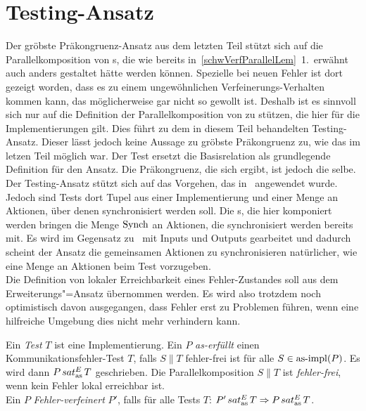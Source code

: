 \section{Testing-Ansatz}

Der gröbste Präkongruenz-Ansatz aus dem letzten Teil stützt sich auf die
Parallelkomposition von \MEIO{}s, die wie bereits
in~\ref{schwVerfParallelLem}~1.\ erwähnt auch anders gestaltet hätte werden
können. Spezielle bei neuen Fehler ist dort gezeigt worden, dass es zu einem
ungewöhnlichen Verfeinerungs-Verhalten kommen kann, das möglicherweise gar
nicht so gewollt ist. Deshalb ist es sinnvoll sich nur auf die Definition der
Parallelkomposition von \EIO{} zu stützen, die hier für die Implementierungen
gilt. Dies führt zu dem in diesem Teil behandelten Testing-Ansatz. Dieser lässt
jedoch keine Aussage zu gröbste Präkongruenz zu, wie das im letzen Teil möglich
war. Der Test ersetzt die Basisrelation als grundlegende Definition für den
Ansatz. Die Präkongruenz, die sich ergibt, ist jedoch die selbe.\\
Der Testing-Ansatz stützt sich auf das Vorgehen, das
in~\cite{Vogler2015FailSem} angewendet wurde. Jedoch sind Tests dort Tupel aus
einer Implementierung und einer Menge an Aktionen, über denen synchronisiert
werden soll. Die \MEIO{}s, die hier komponiert werden bringen die Menge
$\mathrm{Synch}$ an Aktionen, die synchronisiert werden bereits mit. Es wird im
Gegensatz zu~\cite{Vogler2015FailSem} mit Inputs und Outputs gearbeitet und
dadurch scheint der Ansatz die gemeinsamen Aktionen zu synchronisieren
natürlicher, wie eine Menge an Aktionen beim Test vorzugeben.\\
Die Definition von lokaler Erreichbarkeit eines Fehler-Zustandes soll aus dem
Erweiterungs"=Ansatz übernommen werden. Es wird also trotzdem noch
optimistisch davon ausgegangen, dass Fehler erst zu Problemen führen, wenn eine
hilfreiche Umgebung dies nicht mehr verhindern kann.

\begin{Def}
  \label{KommTestDef}
  Ein \emph{Test} $T$ ist eine Implementierung. Ein \MEIO{} $P$
  \emph{as-erfüllt} einen Kommunikationsfehler-Test $T$, falls $S\|T$
  fehler-frei ist für alle $S\in \mathrm{as}\text{-}\mathrm{impl} (P)$. Es wird dann $P \hspace{0.05cm}sat_\mathrm{as}^E\hspace{0.05cm} T$
  geschrieben. Die Parallelkomposition $S\|T$ ist \emph{fehler-frei}, wenn kein
  Fehler lokal erreichbar ist.\\
  Ein \MEIO{} $P$ \emph{Fehler-verfeinert} $P'$, falls für alle Tests $T$:
  $P'\hspace{0.05cm}sat_\mathrm{as}^E\hspace{0.05cm} T \Rightarrow P\hspace{0.05cm}sat_\mathrm{as}^E\hspace{0.05cm} T$.
\end{Def}

